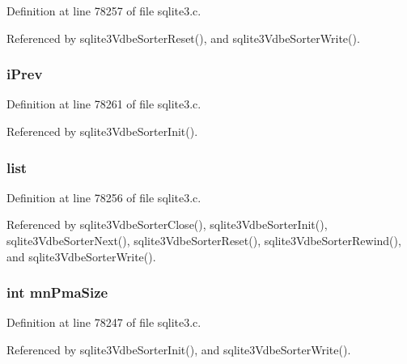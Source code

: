 Definition at line 78257 of file sqlite3.\+c.



Referenced by sqlite3\+Vdbe\+Sorter\+Reset(), and sqlite3\+Vdbe\+Sorter\+Write().

\hypertarget{struct_vdbe_sorter_ac894894ccae70e0d1291ee9c50e14ea4}{}
\subsubsection[{i\+Prev}]{ i\+Prev}\label{struct_vdbe_sorter_ac894894ccae70e0d1291ee9c50e14ea4}


Definition at line 78261 of file sqlite3.\+c.



Referenced by sqlite3\+Vdbe\+Sorter\+Init().

\hypertarget{struct_vdbe_sorter_a0b728adf85f50e92f631147bac5f46ac}{}
\subsubsection[{list}]{ list}\label{struct_vdbe_sorter_a0b728adf85f50e92f631147bac5f46ac}


Definition at line 78256 of file sqlite3.\+c.



Referenced by sqlite3\+Vdbe\+Sorter\+Close(), sqlite3\+Vdbe\+Sorter\+Init(), sqlite3\+Vdbe\+Sorter\+Next(), sqlite3\+Vdbe\+Sorter\+Reset(), sqlite3\+Vdbe\+Sorter\+Rewind(), and sqlite3\+Vdbe\+Sorter\+Write().

\hypertarget{struct_vdbe_sorter_acc7b17ceec962249897b35cf74e32d12}{}
\subsubsection[{mn\+Pma\+Size}]{\setlength{\rightskip}{0pt plus 5cm}int mn\+Pma\+Size}\label{struct_vdbe_sorter_acc7b17ceec962249897b35cf74e32d12}


Definition at line 78247 of file sqlite3.\+c.



Referenced by sqlite3\+Vdbe\+Sorter\+Init(), and sqlite3\+Vdbe\+Sorter\+Write().

